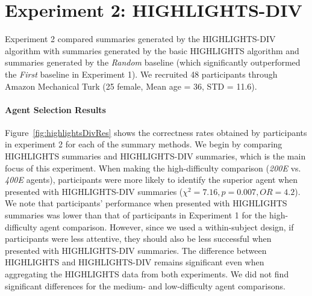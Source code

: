 \section{Experiment 2: HIGHLIGHTS-DIV}
Experiment 2 compared summaries generated by the HIGHLIGHTS-DIV algorithm with summaries generated by the basic HIGHLIGHTS algorithm and summaries generated by the \emph{Random} baseline (which significantly outperformed the \emph{First} baseline in Experiment 1). We recruited 48 participants through Amazon Mechanical Turk (25 female, Mean age = 36, STD = 11.6).  

\paragraph{Agent Selection Results} 
Figure~\ref{fig:highlightsDivRes} shows the correctness rates obtained by participants in experiment 2 for each of the summary methods. We begin by comparing HIGHLIGHTS summaries and HIGHLIGHTS-DIV summaries, which is the main focus of this experiment. 
When making the high-difficulty comparison (\emph{200E} vs. \emph{400E} agents), participants were more likely to identify the superior agent when presented with HIGHLIGHTS-DIV summaries ($\chi^2=7.16, p=0.007, OR = 4.2$). We note that participants' performance when presented with HIGHLIGHTS summaries was lower than that of participants in Experiment 1 for the high-difficulty agent comparison. However, since we used a within-subject design, if participants were less attentive, they should also be less successful when presented with HIGHLIGHTS-DIV summaries. The difference between HIGHLIGHTS and HIGHLIGHTS-DIV remains significant even when aggregating the HIGHLIGHTS data from both experiments. We did not find  significant differences for the medium- and low-difficulty agent comparisons. 

